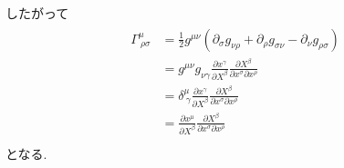 \documentclass[uplatex,a4j,11pt,dvipdfmx]{jsarticle}
\begin{document}
したがって
\begin{align}
  \begin{split}  
    \Gamma^{\mu}_{\ \rho\sigma}&=\frac{1}{2}g^{\mu\nu}\left(\partial_\sigma g_{\nu\rho}+\partial_\rho g_{\sigma\nu}-\partial_\nu g_{\rho\sigma}\right)\\
    &=g^{\mu\nu}g_{\nu\gamma}\frac{\partial x^\gamma}{\partial X^\beta}\frac{\partial X^\beta}{\partial x^\sigma\partial x^\rho}\\
    &=\delta^{\mu}_{\ \gamma}\frac{\partial x^\gamma}{\partial X^\beta}\frac{\partial X^\beta}{\partial x^\sigma\partial x^\rho}\\
    &=\frac{\partial x^\mu}{\partial X^\beta}\frac{\partial X^\beta}{\partial x^\sigma\partial x^\rho}\\
  \end{split}
\end{align}
となる.
\end{document}
